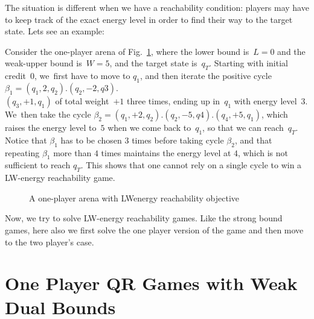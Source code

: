 The situation is different when we have a reachability condition: players may have to keep track of the exact energy level in order to find their way to the target state. Lets see an example:
\begin{example}
\label{ex-LW}
Consider the one-player arena of Fig.~\ref{fig-exLW}, where the lower bound is~$L=0$ and the weak-upper bound is~$W=5$, and the target state is~$q_T$. Starting with initial credit~$0$, we~first have to move to $q_1$, and then iterate the positive cycle $\beta_1=(q_1,2,q_2).(q_2,-2,q3).$\\
$(q_3,+1,q_1)$ of total weight~$+1$ three times, ending up in~$q_1$ with energy level~$3$. We~then take the cycle $\beta_2=(q_1,+2,q_2).(q_2,-5,q4).(q_4,+5,q_1)$,
which raises the energy level to~$5$ when we come back to~$q_1$, so
that we can reach~$q_T$. Notice that $\beta_1$ has to be chosen $3$ times before taking cycle $\beta_2$, and that repeating $\beta_1$ more than $4$ times maintains the energy level at $4$, which is not sufficient to reach $q_T$. This shows that one cannot rely on a single cycle to win a LW-energy reachability game.
\end{example}
\vskip 1cm    
\begin{figure}[htbp]
  \centering
  \caption{A one-player arena with LWenergy reachability objective}
  \label{fig-exLW}
\end{figure}


Now, we try to solve LW-energy reachability games. Like the strong bound games, here also we first solve the one player version of the game and then move to the two player's case.

\section{One Player QR Games with Weak Dual Bounds}
\label{sec-weak}

